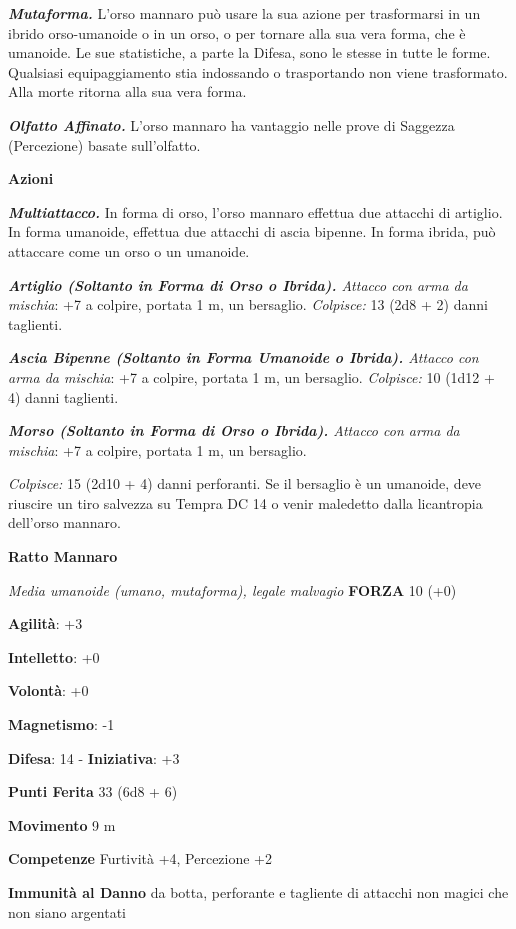 \begin{multicols}{2}
\emph{\textbf{Mutaforma.}} L'orso mannaro può usare la sua azione per
trasformarsi in un ibrido orso-umanoide o in un orso, o per tornare alla
sua vera forma, che è umanoide. Le sue statistiche, a parte la Difesa, sono
le stesse in tutte le forme. Qualsiasi equipaggiamento stia indossando o
trasportando non viene trasformato. Alla morte ritorna alla sua vera
forma.

\emph{\textbf{Olfatto Affinato.}} L'orso mannaro ha vantaggio nelle
prove di Saggezza (Percezione) basate sull'olfatto.

\smallskip\textbf{Azioni}

\emph{\textbf{Multiattacco.}} In forma di orso, l'orso mannaro effettua
due attacchi di artiglio. In forma umanoide, effettua due attacchi di
ascia bipenne. In forma ibrida, può attaccare come un orso o un
umanoide.

\emph{\textbf{Artiglio (Soltanto in Forma di Orso o Ibrida).} Attacco
con arma da mischia}: +7 a colpire, portata 1 m, un bersaglio.
\emph{Colpisce:} 13 (2d8 + 2) danni taglienti.

\emph{\textbf{Ascia Bipenne (Soltanto in Forma Umanoide o Ibrida).}
Attacco con arma da mischia}: +7 a colpire, portata 1 m, un bersaglio.
\emph{Colpisce:} 10 (1d12 + 4) danni taglienti.

\emph{\textbf{Morso (Soltanto in Forma di Orso o Ibrida).} Attacco con
arma da mischia}: +7 a colpire, portata 1 m, un bersaglio.

\emph{Colpisce:} 15 (2d10 + 4) danni perforanti. Se il bersaglio è un
umanoide, deve riuscire un tiro salvezza su Tempra DC 14 o venir
maledetto dalla licantropia dell'orso mannaro.

\textbf{Ratto Mannaro}

\emph{Media umanoide (umano, mutaforma), legale malvagio} \textbf{FORZA}
10 (+0)

\textbf{Agilità}: +3

\textbf{Intelletto}: +0

\textbf{Volontà}: +0

\textbf{Magnetismo}: -1

\textbf{Difesa}: 14 - \textbf{Iniziativa}: +3

\textbf{Punti Ferita} 33 (6d8 + 6)

\textbf{Movimento} 9 m

\textbf{Competenze} Furtività +4, Percezione +2

\textbf{Immunità al Danno} da botta, perforante e tagliente di
attacchi non magici che non siano argentati


\end{multicols}
